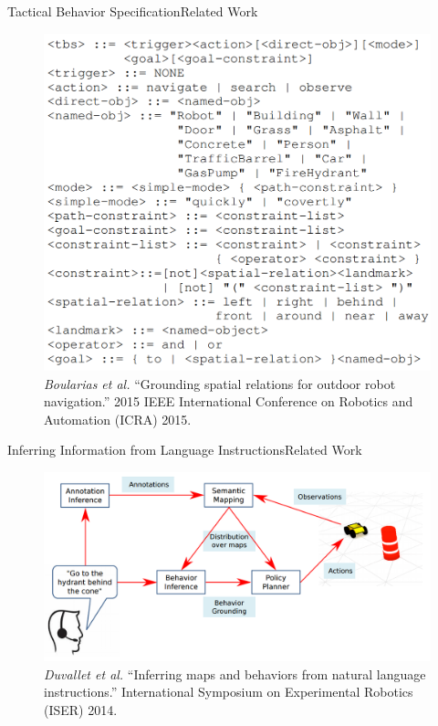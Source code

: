 \begin{frame}{Tactical Behavior Specification}{Related Work}

\begin{figure}
	\centering
	\includegraphics[width=.5\linewidth]{figure/tactical_behavior_specification}
	\caption{ \tiny{ {\it Boularias et al. } ``Grounding spatial relations for outdoor robot navigation.'' 2015 IEEE International Conference on Robotics and Automation (ICRA) 2015. } }
\end{figure}

\end{frame}

\begin{frame}{Inferring Information from Language Instructions}{Related Work}

\begin{figure}
	\centering
	\includegraphics[width=.7\linewidth]{figure/inferring_information_from_language}
	\caption{ \tiny{ {\it Duvallet et al. } ``Inferring maps and behaviors from natural language instructions.'' International Symposium on Experimental Robotics (ISER)  2014. } }
\end{figure}

\end{frame}

